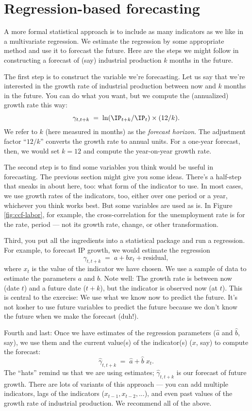 \section{Regression-based forecasting}

A more formal statistical approach is to include
as many indicators as we like in a multivariate regression.
We estimate the regression by some appropriate method
and use it to forecast the future.
Here are the steps we might follow in constructing a forecast
of (say) industrial production $k$ months in the future.

The first step is to construct the variable we're forecasting.
Let us say that we're interested in the growth rate of industrial
production between now and $k$ months in the future.
You can do what you want, but we compute the (annualized) growth
rate this way:
\[
    \gamma_{t,t+k} \;=\; \ln (\IP_{t+k}/\IP_t) \times (12/k) .
\]
We refer to $k$ (here measured in months) as the {\it forecast
horizon\/}.  The adjustment factor ``$12/k$'' converts the growth
rate to annual units.
For a one-year forecast, then, we would set $k=12$ and compute the
year-on-year growth rate.

The second step is to find some variables you think would be useful
in forecasting.
The previous section might give you some ideas.
There's a half-step that sneaks in about here, too:
what form of the indicator to use.
In most cases, we use growth rates of the indicators, too,
either over one period or a year,
whichever you think works best.
But some variables are used as is.
In Figure \ref{fig:ccf-labor}, for example,
the cross-correlation for the unemployment rate is for the rate, period --- not its growth rate, change, or other transformation.

Third, you put all the ingredients into a statistical package and run a regression.
For example, to forecast IP growth, we would estimate the regression
\[
        \gamma_{t,t+k}  \;=\;  a + b x_t + \mbox{residual},
\]
where $x_t$ is the value of the indicator we have chosen.
We use a sample of data to estimate the parameters $a$ and $b$.
Note well:  The growth rate is between now (date $t$)
and a future date ($t+k$),
but the indicator is observed now (at $t$).
This is central to the exercise:  We use what we know now
to predict the future.
It's not kosher to use future variables to predict the future
because we don't know the future when we make the forecast
(duh!).


Fourth and last:
Once we have estimates of the regression
parameters ($\widehat{a}$ and $\widehat{b}$, say),
we use them and the current value(s)
of the indicator(s) ($x$, say)
to compute the forecast:
\[
        \widehat{\gamma}_{t,t+k}  \;=\;  \widehat{a} + \widehat{b} \; x_t .
\]
The ``hats'' remind us that we are using estimates;
$\widehat{\gamma}_{t,t+k}$ is our forecast of future growth.
There are lots of variants of this approach --- you can add multiple indicators,
lags of the indicators  ($x_{t-1}, x_{t-2}, ...$),
and even past values of the growth rate of industrial
production.
We recommend all of the above.


